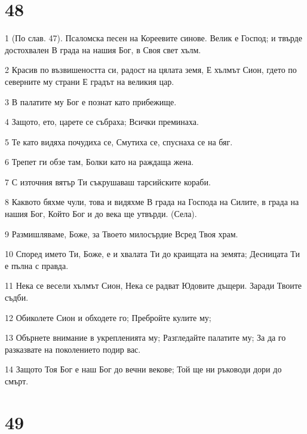\chapter{48}

\par 1 (По слав. 47). Псаломска песен на Кореевите синове. Велик е Господ; и твърде достохвален В града на нашия Бог, в Своя свет хълм.
\par 2 Красив по възвишеността си, радост на цялата земя, Е хълмът Сион, гдето по северните му страни Е градът на великия цар.
\par 3 В палатите му Бог е познат като прибежище.
\par 4 Защото, ето, царете се събраха; Всички преминаха.
\par 5 Те като видяха почудиха се, Смутиха се, спуснаха се на бяг.
\par 6 Трепет ги обзе там, Болки като на раждаща жена.
\par 7 С източния вятър Ти съкрушаваш тарсийските кораби.
\par 8 Каквото бяхме чули, това и видяхме В града на Господа на Силите, в града на нашия Бог, Който Бог и до века ще утвърди. (Села).
\par 9 Размишляваме, Боже, за Твоето милосърдие Всред Твоя храм.
\par 10 Според името Ти, Боже, е и хвалата Ти до краищата на земята; Десницата Ти е пълна с правда.
\par 11 Нека се весели хълмът Сион, Нека се радват Юдовите дъщери. Заради Твоите съдби.
\par 12 Обиколете Сион и обходете го; Пребройте кулите му;
\par 13 Обърнете внимание в укрепленията му; Разгледайте палатите му; За да го разказвате на поколението подир вас.
\par 14 Защото Тоя Бог е наш Бог до вечни векове; Той ще ни ръководи дори до смърт.

\chapter{49}

